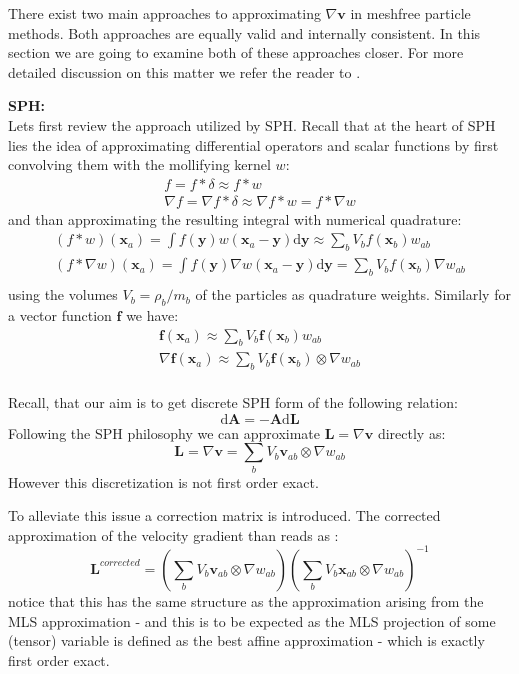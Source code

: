 \documentclass[oneside, a4paper, onecolumn, 11pt]{article}
\renewcommand{\AA}{\mathbf{A}}
\newcommand{\vv}{\mathbf{v}}
\newcommand{\xx}{\mathbf{x}}
\newcommand{\yy}{\mathbf{y}}
\newcommand{\diff}{\mathrm{d}}
\newcommand{\LL}{\mathbf{L}}
\newcommand{\ff}{\mathbf{f}}
\begin{document}
\begin{section}
\begin{subsection}
\begin{subsubsection}
    There exist two main approaches to approximating 
    $\nabla \vv$ in meshfree particle methods. Both approaches are 
    equally valid and internally consistent. In this section we are going to examine both of 
    these approaches closer. 
    For more detailed discussion on this matter we refer the reader to \cite{sph-correction}.

    \textbf{SPH:}\\
    Lets first review the approach utilized by SPH.
    Recall that at the heart of SPH lies the idea of approximating
    differential operators and scalar functions by first convolving
    them with the mollifying kernel $w$:
    \[
        \begin{aligned}
        f = f * \delta \approx f * w\\
        \nabla f = \nabla f * \delta \approx \nabla f * w =
        f * \nabla w
        \end{aligned}
    \]
    and than approximating the resulting integral with numerical 
    quadrature:
    \[
        \begin{aligned}
           \left( f * w \right)(\xx_a) = 
           \int f(\yy) w(\xx_{a} - \yy) \diff \yy \approx 
           \sum_{b} V_{b} f(\xx_b) w_{ab}\\ 
           \left( f * \nabla w \right) (\xx_a) =
           \int f(\yy) \nabla w(\xx_{a} - \yy) \diff \yy = 
           \sum_{b} V_{b} f(\xx_b) \nabla w_{ab}\\ 
        \end{aligned}
    \]
    using the volumes $V_{b} = \rho_{b} / m_b$
    of the particles as quadrature weights.
    Similarly for a vector function $\ff$ we have:
    \[
        \begin{aligned}
           \ff(\xx_a) \approx \sum_{b} V_{b} \ff(\xx_b) w_{ab}\\ 
           \nabla \ff(\xx_a) \approx 
           \sum_{b} V_{b} \ff(\xx_b) \otimes \nabla w_{ab}\\ 
        \end{aligned}
    \]

    Recall, that our aim is to get discrete SPH form of the following 
    relation:
    \[
       \diff \AA = - \AA \diff \LL 
   \]
    Following the SPH philosophy we can approximate $\LL = \nabla \vv$
    directly as:
    \[
        \LL = \nabla \vv = \sum_{b} V_{b} \vv_{ab} \otimes
        \nabla w_{ab}
    \]
    However this discretization is not first order exact.

    To alleviate this issue a correction matrix is introduced.
    The corrected approximation of the velocity gradient than reads
    as \cite{sph-correction}:
    \[
        \LL^{corrected} = \left( \sum_{b} V_{b} \vv_{ab} \otimes
        \nabla w_{ab} \right)
        \left( \sum_{b} V_{b} \xx_{ab} \otimes
        \nabla w_{ab} \right)^{-1}
    \]
    notice that this has the same structure as the approximation 
    arising from the MLS approximation - and this is to be expected
    as the MLS projection of some (tensor) variable is 
    defined as the best affine approximation - which is exactly
    first order exact.
    

\end{subsubsection}
\end{subsection}
\end{section}
\end{document}

